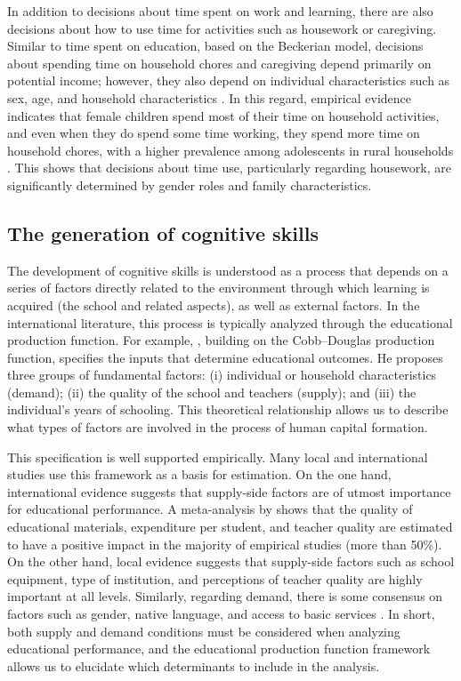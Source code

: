 \documentclass[12pt]{article}
\begin{document}
In addition to decisions about time spent on work and learning, there are also
decisions about how to use time for activities such as housework or caregiving.
Similar to time spent on education, based on the Beckerian model, decisions
about spending time on household chores and caregiving depend primarily on
potential income; however, they also depend on individual characteristics such
as sex, age, and household characteristics \citep{garcia2007}. In this regard,
empirical evidence indicates that female children spend most of their time on
household activities, and even when they do spend some time working, they spend
more time on household chores, with a higher prevalence among adolescents in
rural households \citep{garcia2007, zapata2010}. This shows that decisions
about time use, particularly regarding housework, are significantly determined
by gender roles and family characteristics.

\subsection{The generation of cognitive skills}
\label{subsec:cogskills}

The development of cognitive skills is understood as a process that depends on
a series of factors directly related to the environment through which learning
is acquired (the school and related aspects), as well as external factors. In
the international literature, this process is typically analyzed through the
educational production function. For example, \citet{glewwe2002}, building on
the Cobb--Douglas production function, specifies the inputs that determine
educational outcomes. He proposes three groups of fundamental factors: (i)
individual or household characteristics (demand); (ii) the quality of the
school and teachers (supply); and (iii) the individual's years of schooling.
This theoretical relationship allows us to describe what types of factors are
involved in the process of human capital formation.

This specification is well supported empirically. Many local and international
studies use this framework as a basis for estimation. On the one hand,
international evidence suggests that supply-side factors are of utmost
importance for educational performance. A meta-analysis by \citet{fuller1987}
shows that the quality of educational materials, expenditure per student, and
teacher quality are estimated to have a positive impact in the majority of
empirical studies (more than 50\%). On the other hand, local evidence suggests
that supply-side factors such as school equipment, type of institution, and
perceptions of teacher quality are highly important at all levels. Similarly,
regarding demand, there is some consensus on factors such as gender, native
language, and access to basic services \citep{miranda2008, jopen2014}. In
short, both supply and demand conditions must be considered when analyzing
educational performance, and the educational production function framework
allows us to elucidate which determinants to include in the analysis.
\end{document}
